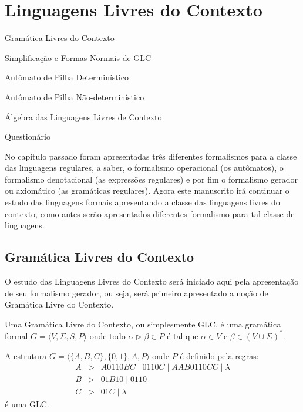 \chapter{Linguagens Livres do Contexto}\label{cap:LinguagemLLC}

\begin{introduction}[Conteúdos]
	\item Gramática Livres do Contexto
	\item Simplificação e Formas Normais de GLC
	\item Autômato de Pilha Determinístico
	\item Autômato de Pilha Não-determinístico
	\item Álgebra das Linguagens Livres de Contexto
	\item Questionário
\end{introduction}

No capítulo passado foram apresentadas três diferentes formalismos para a classe das linguagens regulares, a saber, o formalismo operacional (os autômatos), o formalismo denotacional (as expressões regulares) e por fim o formalismo gerador ou axiomático (as gramáticas regulares). Agora este manuscrito irá continuar o estudo das linguagens formais apresentando a classe das linguagens livres do contexto, como antes serão apresentados diferentes formalismo para tal classe de linguagens.

\section{Gramática Livres do Contexto}\label{sec:GLC}

O estudo das Linguagens Livres do Contexto será iniciado aqui pela apresentação de seu formalismo gerador, ou seja, será primeiro apresentado a noção de Gramática Livre do Contexto.

\begin{definition}\label{def:GLC}
	\cite{benjaLivro2010} Uma Gramática Livre do Contexto, ou simplesmente GLC, é uma gramática formal $G = \langle V, \Sigma, S, P\rangle$ onde todo $\alpha \rhd \beta \in P$ é tal que $\alpha \in V$ e $\beta \in (V \cup \Sigma)^*$.
\end{definition}

\begin{example}\label{exe:GLC-1}
	A estrutura $G = \langle \{A, B, C\}, \{0,1\}, A, P\rangle$ onde $P$ é definido pela regras:
	\begin{eqnarray*}
		A & \rhd & A0110BC \mid 0110C \mid AAB0110CC \mid \lambda\\
		B & \rhd & 01B10 \mid 0110\\
		C & \rhd & 01C \mid \lambda
	\end{eqnarray*}
	é uma GLC.
\end{example}

